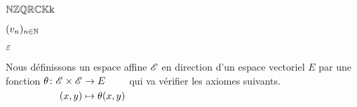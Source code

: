 \documentclass[a4paper, 12pt]{article}
\begin{document}
$\mathbb{N}\mathbb{Z}\mathbb{Q}\mathbb{R}\mathbb{C}\mathbb{K}\Bbbk$

$(v_n)_{n \in \mathbb{N}}$

$\varepsilon$

Nous définissons un espace affine $\mathscr{E}$ en direction d'un espace vectoriel $E$
par une fonction $\begin{aligned}[t] \theta\colon \mathscr{E} \times \mathscr{E} &\to E\\ (x,y) &\mapsto \theta(x,y) \end{aligned}$
qui va vérifier les axiomes suivants.
\end{document}
